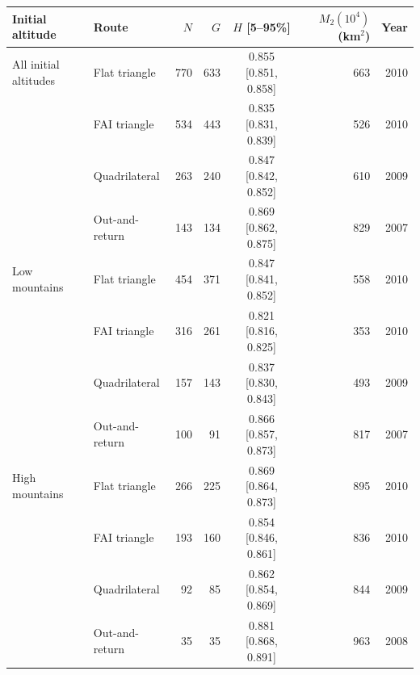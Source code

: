 \begin{tabular}{llrrcrr}
\toprule
Initial altitude & Route & $N$ & $G$ & $H$ [5--95\%] & $M_2(10^4)$ (km$^2$) & Year \\
\midrule
All initial altitudes & Flat triangle & 770 & 633 & 0.855 [0.851, 0.858] & 663 & 2010 \\
 & FAI triangle & 534 & 443 & 0.835 [0.831, 0.839] & 526 & 2010 \\
 & Quadrilateral & 263 & 240 & 0.847 [0.842, 0.852] & 610 & 2009 \\
 & Out-and-return & 143 & 134 & 0.869 [0.862, 0.875] & 829 & 2007 \\
\midrule
Low mountains & Flat triangle & 454 & 371 & 0.847 [0.841, 0.852] & 558 & 2010 \\
 & FAI triangle & 316 & 261 & 0.821 [0.816, 0.825] & 353 & 2010 \\
 & Quadrilateral & 157 & 143 & 0.837 [0.830, 0.843] & 493 & 2009 \\
 & Out-and-return & 100 & 91 & 0.866 [0.857, 0.873] & 817 & 2007 \\
\midrule
High mountains & Flat triangle & 266 & 225 & 0.869 [0.864, 0.873] & 895 & 2010 \\
 & FAI triangle & 193 & 160 & 0.854 [0.846, 0.861] & 836 & 2010 \\
 & Quadrilateral & 92 & 85 & 0.862 [0.854, 0.869] & 844 & 2009 \\
 & Out-and-return & 35 & 35 & 0.881 [0.868, 0.891] & 963 & 2008 \\
\bottomrule
\end{tabular}
